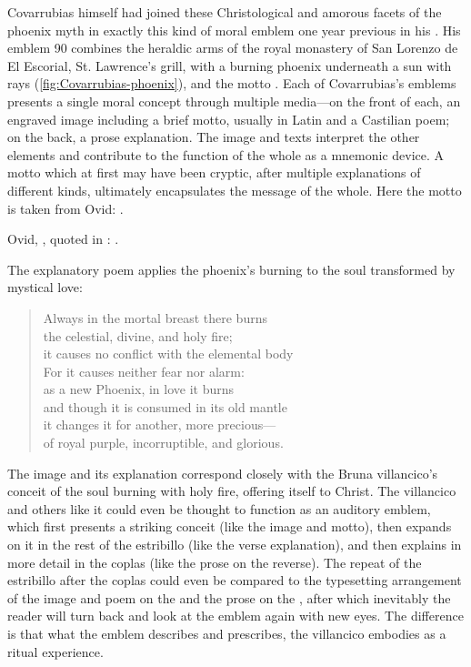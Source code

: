 Covarrubias himself had joined these Christological and amorous facets of the
phoenix myth in exactly this kind of moral emblem one year previous in his
.
His emblem 90 combines the heraldic arms of the royal monastery of San Lorenzo
de El Escorial, St. Lawrence's grill, with a burning phoenix underneath a sun
with rays (\cref{fig:Covarrubias-phoenix}), and the motto .%
    \Autocite[]{Covarrubias:Emblemas}
Each of Covarrubias's emblems presents a single moral concept through multiple
media---on the front of each, an engraved image including a brief motto,
usually in Latin and a Castilian poem; on the back, a prose explanation.
The image and texts interpret the other elements and contribute to the function
of the whole as a mnemonic device. 
A motto which at first may have been cryptic, after multiple explanations of
different kinds, ultimately encapsulates the message of the whole.
Here the motto is taken from Ovid: .%
\begin{Footnote}
    Ovid, , quoted in
    \autocite[290v]{Covarrubias:Emblemas}: .
\end{Footnote}
The explanatory poem applies the phoenix's burning to the soul transformed by
mystical love:
\begin{quoting}
\begin{verse}
Always in the mortal breast there burns\\
the celestial, divine, and holy fire;\\ 
it causes no conflict with the elemental body\\
For it causes neither fear nor alarm:\\
as a new Phoenix, in love it burns\\
and though it is consumed in its old mantle\\
it changes it for another, more precious---\\
of royal purple, incorruptible, and glorious.
\end{verse}
\end{quoting}
The image and its explanation correspond closely with the Bruna villancico's
conceit of the soul burning with holy fire, offering itself to Christ.
The villancico and others like it could even be thought to function as an
auditory emblem, which first presents a striking conceit (like the image and
motto), then expands on it in the rest of the estribillo (like the verse
explanation), and then explains in more detail in the coplas (like the prose on
the reverse).
The repeat of the estribillo after the coplas could even be compared to the
typesetting arrangement of the image and poem on the  and the prose
on the , after which inevitably the reader will turn back and look
at the emblem again with new eyes.
The difference is that what the emblem describes and prescribes, the villancico
embodies as a ritual experience.

